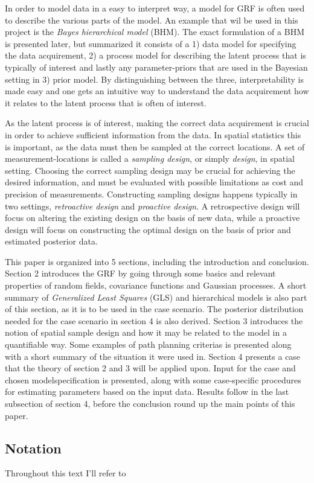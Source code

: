 In order to model data in a easy to interpret way, a model for GRF is often used to describe the various parts of the model. An example that wil be used in this project is the \textit{Bayes hierarchical model} (BHM). The exact formulation of a BHM is presented later, but summarized it consists of a 1) data model for specifying the data acquirement, 2) a process model for describing the latent process that is typically of interest and lastly any parameter-priors that are used in the Bayesian setting in 3) prior model. By distinguishing between the three, interpretability is made easy and one gets an intuitive way to understand the data acquirement how it relates to the latent process that is often of interest. 

As the latent process is of interest, making the correct data acquirement is crucial in order to achieve sufficient information from the data. In spatial statistics this is important, as the data must then be sampled at the correct locations. A set of measurement-locations is called a \textit{sampling design}, or simply \textit{design}, in spatial setting. Choosing the correct sampling design may be crucial for achieving the desired information, and must be evaluated with possible limitations as cost and precision of measurements. Constructing sampling designs happens typically in two settings, \textit{retroactive design} and \textit{proactive design}. A retrospective design will focus on altering the existing design on the basis of new data, while a proactive design will focus on constructing the optimal design on the basis of prior and estimated posterior data. 

This paper is organized into 5 sections, including the introduction and conclusion. Section 2 introduces the GRF by going through some basics and relevant properties of random fields, covariance functions and Gaussian processes. A short summary of \textit{Generalized Least Squares} (GLS) and hierarchical models is also part of this section, as it is to be used in the case scenario. The posterior distribution needed for the case scenario in section 4 is also derived. Section 3 introduces the notion of spatial sample design and how it may be related to the model in a quantifiable way. Some examples of path planning criterias is presented along with a short summary of the situation it were used in. Section 4 presents a case that the theory of section 2 and 3 will be applied upon. Input for the case and chosen modelspecification is presented, along with some case-specific procedures for estimating parameters based on the input data. Results follow in the last subsection of section 4, before the conclusion round up the main points of this paper.  

\subsection*{Notation} 
Throughout this text I'll refer to 